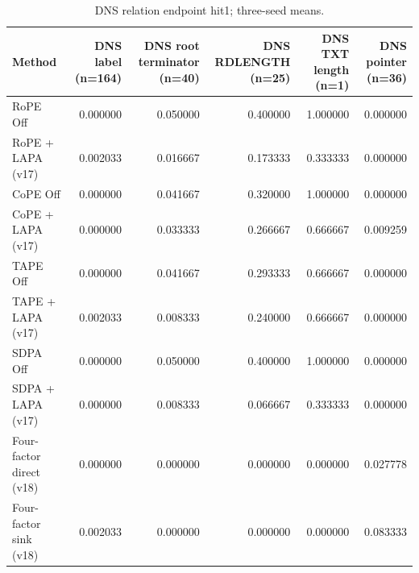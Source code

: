 \begin{table}[t]
\centering
\scriptsize
\caption{DNS relation endpoint hit1; three-seed means.}
\begin{tabular}{lrrrrr}
\toprule
Method & DNS label (n=164) & DNS root terminator (n=40) & DNS RDLENGTH (n=25) & DNS TXT length (n=1) & DNS pointer (n=36) \\
\midrule
RoPE Off & 0.000000 & 0.050000 & 0.400000 & 1.000000 & 0.000000 \\
RoPE + LAPA (v17) & 0.002033 & 0.016667 & 0.173333 & 0.333333 & 0.000000 \\
CoPE Off & 0.000000 & 0.041667 & 0.320000 & 1.000000 & 0.000000 \\
CoPE + LAPA (v17) & 0.000000 & 0.033333 & 0.266667 & 0.666667 & 0.009259 \\
TAPE Off & 0.000000 & 0.041667 & 0.293333 & 0.666667 & 0.000000 \\
TAPE + LAPA (v17) & 0.002033 & 0.008333 & 0.240000 & 0.666667 & 0.000000 \\
SDPA Off & 0.000000 & 0.050000 & 0.400000 & 1.000000 & 0.000000 \\
SDPA + LAPA (v17) & 0.000000 & 0.008333 & 0.066667 & 0.333333 & 0.000000 \\
Four-factor direct (v18) & 0.000000 & 0.000000 & 0.000000 & 0.000000 & 0.027778 \\
Four-factor sink (v18) & 0.002033 & 0.000000 & 0.000000 & 0.000000 & 0.083333 \\
\bottomrule
\end{tabular}
\end{table}
